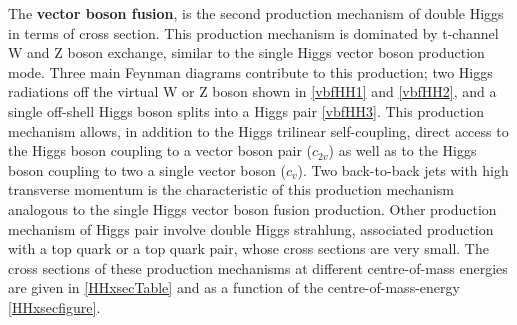 The \textbf{vector boson fusion}, is the second production mechanism of double Higgs in terms of cross section. This production mechanism is dominated by t-channel W and Z boson exchange, similar to the single Higgs vector boson production mode. Three main Feynman diagrams contribute to this production; two Higgs radiations off the virtual W or Z boson shown in \autoref{vbfHH1} and \autoref{vbfHH2}, and a single off-shell Higgs boson splits into a Higgs pair \autoref{vbfHH3}. This production mechanism allows, in addition to the Higgs trilinear self-coupling, direct access to the Higgs boson coupling to a vector boson pair ($c_{2v}$) as well as to the Higgs boson coupling to two a single vector boson ($c_v$). Two back-to-back jets with high transverse momentum is the characteristic of this production mechanism analogous to the single Higgs vector boson fusion production. Other production mechanism of Higgs pair involve double Higgs strahlung, associated production with a top quark or a top quark pair, whose cross sections are very small. The cross sections of these production mechanisms at different centre-of-mass energies are given in \autoref{HHxsecTable} and as a function of the centre-of-mass-energy \autoref{HHxsecfigure}.

